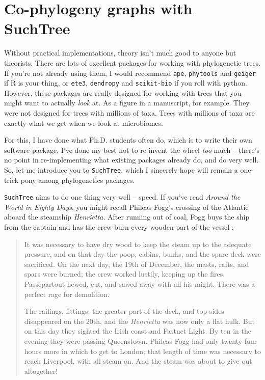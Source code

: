 \documentclass[
10pt, %
a4paper, %
oneside, %
headinclude,footinclude, %
BCOR5mm, %
]{scrartcl}
\begin{document}
\section{Co-phylogeny graphs with SuchTree}

Without practical implementations, theory isn't much good to anyone but theorists. There are lots of excellent packages for working with phylogenetic trees. If you're not already using them, I would recommend {\tt ape}, {\tt phytools} and {\tt geiger} if R is your thing, or {\tt ete3}, {\tt dendropy} and {\tt scikit-bio} if you roll with python. However, these packages are really designed for working with trees that you might want to actually {\em look} at. As a figure in a manuscript, for example. They were not designed for trees with millions of taxa. Trees with millions of taxa are exactly what we get when we look at microbiomes.

For this, I have done what Ph.D. students often do, which is to write their own software package. I've done my best not to re-invent the wheel {\em too} much -- there's no point in re-implementing what existing packages already do, and do very well. So, let me introduce you to {\tt SuchTree}, which I sincerely hope will remain a one-trick pony among phylogenetics packages.

{\tt SuchTree} aims to do one thing very well -- speed. If you've read {\em Around the World in Eighty Days}, you might recall Phileas Fogg's crossing of the Atlantic aboard the steamship {\em Henrietta}. After running out of coal, Fogg buys the ship from the captain and has the crew burn every wooden part of the vessel :

\begin{quote}
It was necessary to have dry wood to keep the steam up to the adequate pressure, and on that day the poop, cabins, bunks, and the spare deck were sacrificed. On the next day, the 19th of December, the masts, rafts, and spars were burned; the crew worked lustily, keeping up the fires. Passepartout hewed, cut, and sawed away with all his might. There was a perfect rage for demolition.

The railings, fittings, the greater part of the deck, and top sides disappeared on the 20th, and the {\em Henrietta} was now only a flat hulk. But on this day they sighted the Irish coast and Fastnet Light. By ten in the evening they were passing Queenstown. Phileas Fogg had only twenty-four hours more in which to get to London; that length of time was necessary to reach Liverpool, with all steam on. And the steam was about to give out altogether!
\end{quote}
\end{document}

